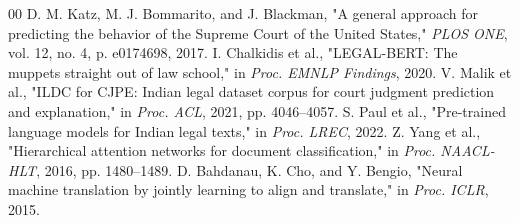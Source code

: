 \documentclass[11pt,a4paper]{article}
\begin{document}
\begin{thebibliography}{00}
 D. M. Katz, M. J. Bommarito, and J. Blackman, "A general approach for predicting the behavior of the Supreme Court of the United States," \textit{PLOS ONE}, vol. 12, no. 4, p. e0174698, 2017.
 I. Chalkidis et al., "LEGAL-BERT: The muppets straight out of law school," in \textit{Proc. EMNLP Findings}, 2020.
 V. Malik et al., "ILDC for CJPE: Indian legal dataset corpus for court judgment prediction and explanation," in \textit{Proc. ACL}, 2021, pp. 4046--4057.
 S. Paul et al., "Pre-trained language models for Indian legal texts," in \textit{Proc. LREC}, 2022.
 Z. Yang et al., "Hierarchical attention networks for document classification," in \textit{Proc. NAACL-HLT}, 2016, pp. 1480--1489.
 D. Bahdanau, K. Cho, and Y. Bengio, "Neural machine translation by jointly learning to align and translate," in \textit{Proc. ICLR}, 2015.
\end{thebibliography}
\end{document}
